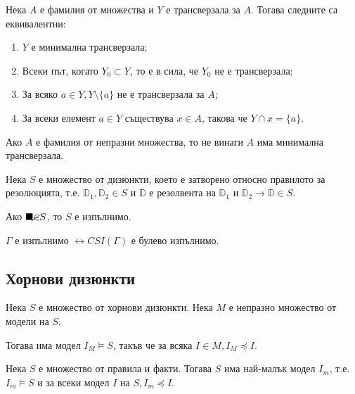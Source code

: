\documentclass{article}
\begin{document}
\begin{claim}
Нека $A$ е фамилия от множества и $Y$ е трансверзала за $A$. Тогава следните са еквивалентни:
\begin{enumerate}
\item $Y$ е минимална трансверзала;
\item Всеки път, когато $Y_0 \subset Y$, то е в сила, че $Y_0$ не е трансверзала;
\item За всяко $a \in Y, Y \setminus \{a\}$ не е трансверзала за $A$;
\item За всеки елемент $a \in Y$ съществува $x \in A$, такова че $Y \cap x = \{a\}$.
\end{enumerate}
\end{claim}

\begin{claim}
Ако $A$ е фамилия от непразни множества, то не винаги $A$ има минимална трансверзала.
\end{claim}

\begin{claim}
Нека $S$ е множество от дизюнкти, което е затворено относно правилото за резолюцията, т.е. $\mathbb{D}_1, \mathbb{D}_2 \in S$ и $\mathbb{D}$ е резолвента на $\mathbb{D}_1$ и $\mathbb{D}_2 \longrightarrow \mathbb{D} \in S$.

Ако $\blacksquare \cancel{\in} S$, то $S$ е изпълнимо.
\end{claim}

\begin{claim}
$\Gamma$ е изпълнимо $\longleftrightarrow CSI(\Gamma)$ е булево изпълнимо.
\end{claim}

\subsection*{Хорнови дизюнкти}

\begin{claim}
Нека $S$ е множество от хорнови дизюнкти. Нека $M$ е непразно множество от модели на $S$.

Тогава има модел $I_M \models S$, такъв че за всяка $I \in M, I_M \preccurlyeq I$.

\setcounter{conseq}{0}
\begin{conseq}
Нека $S$ е множество от правила и факти. Тогава $S$ има най-малък модел $I_m$, т.е. $I_m \models S$ и за всеки модел $I$ на $S, I_m \preccurlyeq I$.
\end{conseq}

\end{claim}
\end{document}
